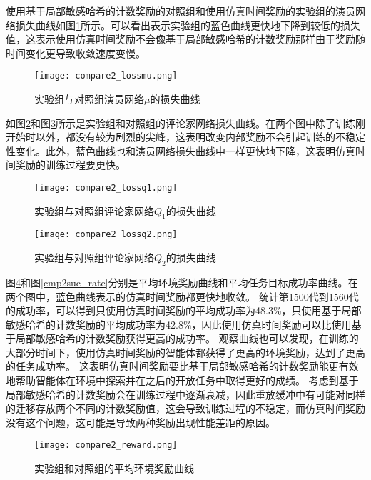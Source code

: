 使用基于局部敏感哈希的计数奖励的对照组和使用仿真时间奖励的实验组的演员网络损失曲线如图\ref{cmp2lossmu}所示。可以看出表示实验组的蓝色曲线更快地下降到较低的损失值，这表示使用仿真时间奖励不会像基于局部敏感哈希的计数奖励那样由于奖励随时间变化更导致收敛速度变慢。

        \begin{figure}[htpb]
        \centering
        \texttt{[image: compare2\_lossmu.png]}
        \caption{实验组与对照组演员网络$\mu$的损失曲线}
            \label{cmp2lossmu}
        \end{figure}

如图\ref{cmp2lossq1}和图\ref{cmp2lossq2}所示是实验组和对照组的评论家网络损失曲线。在两个图中除了训练刚开始时以外，都没有较为剧烈的尖峰，这表明改变内部奖励不会引起训练的不稳定性变化。此外，蓝色曲线也和演员网络损失曲线中一样更快地下降，这表明仿真时间奖励的训练过程要更快。

        \begin{figure}[htpb]
        \centering
        \texttt{[image: compare2\_lossq1.png]}
        \caption{实验组与对照组评论家网络$Q_1$的损失曲线}
            \label{cmp2lossq1}
        \end{figure}

        \begin{figure}[htpb]
        \centering
        \texttt{[image: compare2\_lossq2.png]}
        \caption{实验组与对照组评论家网络$Q_2$的损失曲线}
            \label{cmp2lossq2}
        \end{figure}

图\ref{cmp2env_reward}和图\ref{cmp2suc_rate}分别是平均环境奖励曲线和平均任务目标成功率曲线。在两个图中，蓝色曲线表示的仿真时间奖励都更快地收敛。
统计第1500代到1560代的成功率，可以得到只使用仿真时间奖励的平均成功率为48.3\%，只使用基于局部敏感哈希的计数奖励的平均成功率为42.8\%，因此使用仿真时间奖励可以比使用基于局部敏感哈希的计数奖励获得更高的成功率。
观察曲线也可以发现，在训练的大部分时间下，使用仿真时间奖励的智能体都获得了更高的环境奖励，达到了更高的任务成功率。
这表明仿真时间奖励要比基于局部敏感哈希的计数奖励能更有效地帮助智能体在环境中探索并在之后的开放任务中取得更好的成绩。
考虑到基于局部敏感哈希的计数奖励会在训练过程中逐渐衰减，因此重放缓冲中有可能对同样的迁移存放两个不同的计数奖励值，这会导致训练过程的不稳定，而仿真时间奖励没有这个问题，这可能是导致两种奖励出现性能差距的原因。
        \begin{figure}[htpb]
        \centering
        \texttt{[image: compare2\_reward.png]}
        \caption{实验组和对照组的平均环境奖励曲线}
            \label{cmp2env_reward}
        \end{figure}

